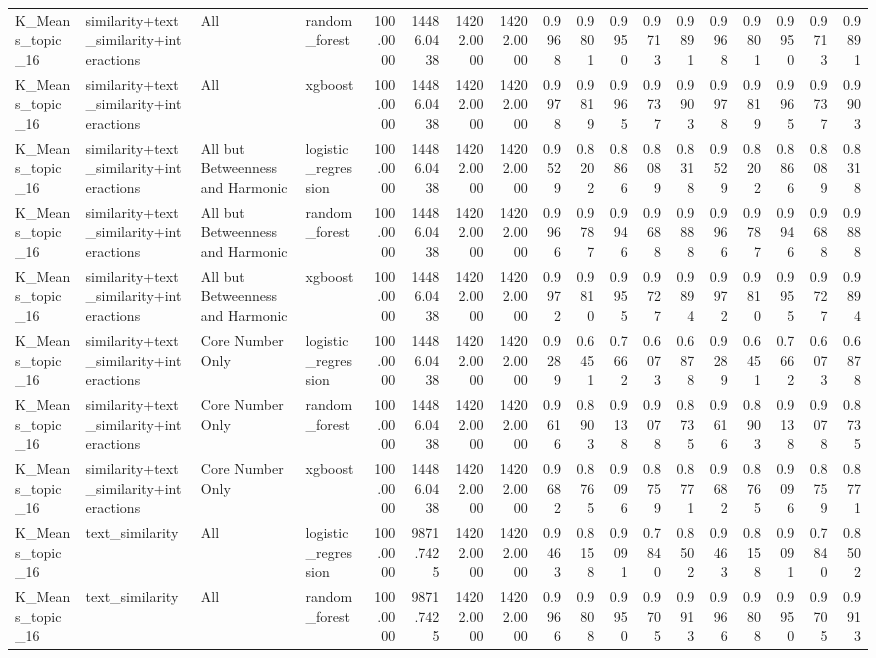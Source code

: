 \begin{tabular}{llllrrrrrrrrrrrrrr}
K_Means_topic_16 & similarity+text_similarity+interactions & All & random_forest & 100.0000 & 14486.0438 & 14202.0000 & 14202.0000 & 0.9968 & 0.9801 & 0.9950 & 0.9713 & 0.9891 & 0.9968 & 0.9801 & 0.9950 & 0.9713 & 0.9891 \\
K_Means_topic_16 & similarity+text_similarity+interactions & All & xgboost & 100.0000 & 14486.0438 & 14202.0000 & 14202.0000 & 0.9978 & 0.9819 & 0.9965 & 0.9737 & 0.9903 & 0.9978 & 0.9819 & 0.9965 & 0.9737 & 0.9903 \\
K_Means_topic_16 & similarity+text_similarity+interactions & All but Betweenness and Harmonic & logistic_regression & 100.0000 & 14486.0438 & 14202.0000 & 14202.0000 & 0.9529 & 0.8202 & 0.8866 & 0.8089 & 0.8318 & 0.9529 & 0.8202 & 0.8866 & 0.8089 & 0.8318 \\
K_Means_topic_16 & similarity+text_similarity+interactions & All but Betweenness and Harmonic & random_forest & 100.0000 & 14486.0438 & 14202.0000 & 14202.0000 & 0.9966 & 0.9787 & 0.9946 & 0.9688 & 0.9888 & 0.9966 & 0.9787 & 0.9946 & 0.9688 & 0.9888 \\
K_Means_topic_16 & similarity+text_similarity+interactions & All but Betweenness and Harmonic & xgboost & 100.0000 & 14486.0438 & 14202.0000 & 14202.0000 & 0.9972 & 0.9810 & 0.9955 & 0.9727 & 0.9894 & 0.9972 & 0.9810 & 0.9955 & 0.9727 & 0.9894 \\
K_Means_topic_16 & similarity+text_similarity+interactions & Core Number Only & logistic_regression & 100.0000 & 14486.0438 & 14202.0000 & 14202.0000 & 0.9289 & 0.6451 & 0.7662 & 0.6073 & 0.6878 & 0.9289 & 0.6451 & 0.7662 & 0.6073 & 0.6878 \\
K_Means_topic_16 & similarity+text_similarity+interactions & Core Number Only & random_forest & 100.0000 & 14486.0438 & 14202.0000 & 14202.0000 & 0.9616 & 0.8903 & 0.9138 & 0.9078 & 0.8735 & 0.9616 & 0.8903 & 0.9138 & 0.9078 & 0.8735 \\
K_Means_topic_16 & similarity+text_similarity+interactions & Core Number Only & xgboost & 100.0000 & 14486.0438 & 14202.0000 & 14202.0000 & 0.9682 & 0.8765 & 0.9096 & 0.8759 & 0.8771 & 0.9682 & 0.8765 & 0.9096 & 0.8759 & 0.8771 \\
K_Means_topic_16 & text_similarity & All & logistic_regression & 100.0000 & 9871.7425 & 14202.0000 & 14202.0000 & 0.9463 & 0.8158 & 0.9091 & 0.7840 & 0.8502 & 0.9463 & 0.8158 & 0.9091 & 0.7840 & 0.8502 \\
K_Means_topic_16 & text_similarity & All & random_forest & 100.0000 & 9871.7425 & 14202.0000 & 14202.0000 & 0.9966 & 0.9808 & 0.9950 & 0.9705 & 0.9913 & 0.9966 & 0.9808 & 0.9950 & 0.9705 & 0.9913 \\

\end{tabular}
